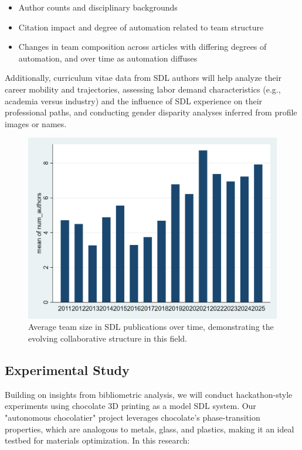 \documentclass[11pt,letterpaper,twocolumn]{article}
\begin{document}
\begin{itemize}
    \item Author counts and disciplinary backgrounds
    \item Citation impact and degree of automation related to team structure
    \item Changes in team composition  across articles with differing degrees of automation, and over time as automation diffuses
    \end{itemize}
Additionally, curriculum vitae data from SDL authors will help analyze their career mobility and trajectories, assessing labor demand characteristics (e.g., academia versus industry) and the influence of SDL experience on their professional paths, and conducting gender disparity analyses inferred from profile images or names. 
\begin{figure}[H]
    \centering
    \includegraphics[width=0.9\linewidth]{num_authors.png}
    \caption{\small Average team size in SDL publications over time, demonstrating the evolving collaborative structure in this field.}
    \label{fig:team_size}
\end{figure}

\subsection{Experimental Study}
Building on insights from bibliometric analysis, we will conduct hackathon-style experiments using chocolate 3D printing as a model SDL system. Our "autonomous chocolatier" project leverages chocolate's phase-transition properties, which are analogous to metals, glass, and plastics, making it an ideal testbed for materials optimization. In this research:
\end{document}
